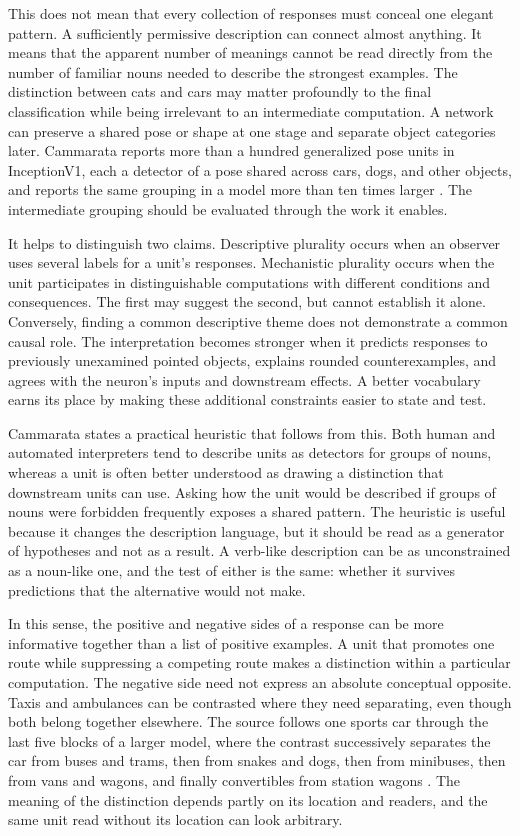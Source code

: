 \documentclass[11pt]{article}
\begin{document}
This does not mean that every collection of responses must conceal one elegant pattern. A sufficiently permissive description can connect almost anything. It means that the apparent number of meanings cannot be read directly from the number of familiar nouns needed to describe the strongest examples. The distinction between cats and cars may matter profoundly to the final classification while being irrelevant to an intermediate computation. A network can preserve a shared pose or shape at one stage and separate object categories later. Cammarata reports more than a hundred generalized pose units in InceptionV1, each a detector of a pose shared across cars, dogs, and other objects, and reports the same grouping in a model more than ten times larger \cite[\emph{Cars and Animals}]{cammarata}. The intermediate grouping should be evaluated through the work it enables.

It helps to distinguish two claims. Descriptive plurality occurs when an observer uses several labels for a unit's responses. Mechanistic plurality occurs when the unit participates in distinguishable computations with different conditions and consequences. The first may suggest the second, but cannot establish it alone. Conversely, finding a common descriptive theme does not demonstrate a common causal role. The interpretation becomes stronger when it predicts responses to previously unexamined pointed objects, explains rounded counterexamples, and agrees with the neuron's inputs and downstream effects. A better vocabulary earns its place by making these additional constraints easier to state and test.

Cammarata states a practical heuristic that follows from this. Both human and automated interpreters tend to describe units as detectors for groups of nouns, whereas a unit is often better understood as drawing a distinction that downstream units can use. Asking how the unit would be described if groups of nouns were forbidden frequently exposes a shared pattern. The heuristic is useful because it changes the description language, but it should be read as a generator of hypotheses and not as a result. A verb-like description can be as unconstrained as a noun-like one, and the test of either is the same: whether it survives predictions that the alternative would not make.

In this sense, the positive and negative sides of a response can be more informative together than a list of positive examples. A unit that promotes one route while suppressing a competing route makes a distinction within a particular computation. The negative side need not express an absolute conceptual opposite. Taxis and ambulances can be contrasted where they need separating, even though both belong together elsewhere. The source follows one sports car through the last five blocks of a larger model, where the contrast successively separates the car from buses and trams, then from snakes and dogs, then from minibuses, then from vans and wagons, and finally convertibles from station wagons \cite[\emph{How I Think About Neurons}]{cammarata}. The meaning of the distinction depends partly on its location and readers, and the same unit read without its location can look arbitrary.
\end{document}

